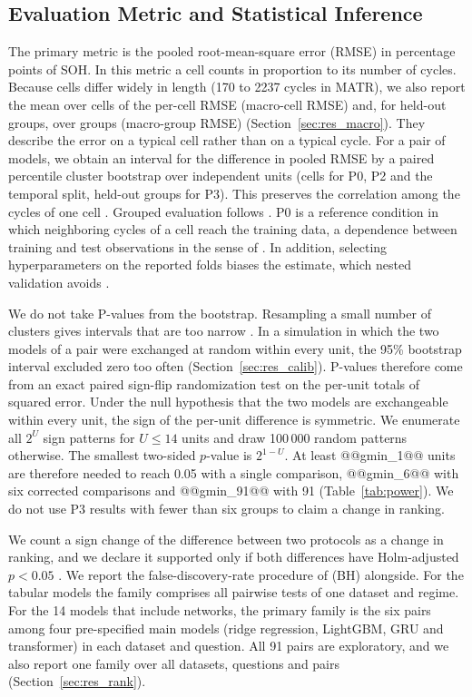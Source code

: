 \documentclass{ieeeaccess}
\begin{document}
\subsection{Evaluation Metric and Statistical Inference}
The primary metric is the pooled root-mean-square error (RMSE) in percentage points of SOH. In this metric a cell counts in proportion to its number of cycles. Because cells differ widely in length (170 to 2237 cycles in MATR), we also report the mean over cells of the per-cell RMSE (macro-cell RMSE) and, for held-out groups, over groups (macro-group RMSE) (Section~\ref{sec:res_macro}). They describe the error on a typical cell rather than on a typical cycle. For a pair of models, we obtain an interval for the difference in pooled RMSE by a paired percentile cluster bootstrap over independent units (cells for P0, P2 and the temporal split, held-out groups for P3). This preserves the correlation among the cycles of one cell \cite{field2007}. Grouped evaluation follows \cite{roberts2017}. P0 is a reference condition in which neighboring cycles of a cell reach the training data, a dependence between training and test observations in the sense of \cite{kaufman2012}. In addition, selecting hyperparameters on the reported folds biases the estimate, which nested validation avoids \cite{varma2006}.

We do not take P-values from the bootstrap. Resampling a small number of clusters gives intervals that are too narrow \cite{cameron2008}. In a simulation in which the two models of a pair were exchanged at random within every unit, the 95\% bootstrap interval excluded zero too often (Section~\ref{sec:res_calib}). P-values therefore come from an exact paired sign-flip randomization test \cite{ernst2004} on the per-unit totals of squared error. Under the null hypothesis that the two models are exchangeable within every unit, the sign of the per-unit difference is symmetric. We enumerate all $2^U$ sign patterns for $U\le14$ units and draw 100\,000 random patterns otherwise. The smallest two-sided $p$-value is $2^{1-U}$. At least @@gmin_1@@ units are therefore needed to reach 0.05 with a single comparison, @@gmin_6@@ with six corrected comparisons and @@gmin_91@@ with 91 (Table~\ref{tab:power}). We do not use P3 results with fewer than six groups to claim a change in ranking.

We count a sign change of the difference between two protocols as a change in ranking, and we declare it supported only if both differences have Holm-adjusted $p<0.05$ \cite{holm1979}. We report the false-discovery-rate procedure of \cite{benjamini1995} (BH) alongside. For the tabular models the family comprises all pairwise tests of one dataset and regime. For the 14 models that include networks, the primary family is the six pairs among four pre-specified main models (ridge regression, LightGBM, GRU and transformer) in each dataset and question. All 91 pairs are exploratory, and we also report one family over all datasets, questions and pairs (Section~\ref{sec:res_rank}).
\end{document}
